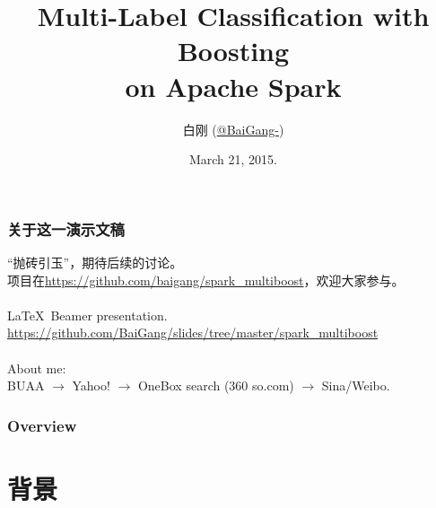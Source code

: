\documentclass{beamer}
\title[MultiBoost]{Multi-Label Classification with Boosting \\ on Apache Spark}
\author{
白刚  (\href{http://weibo.com/baigang111}{@BaiGang-})
} %
\institute[Sina] %
{
\textit{Sina Ad-Algo}
}
\date{March 21, 2015.} %
\begin{document}
\begin{frame}
\titlepage %
\end{frame}

\begin{frame}
\frametitle{关于这一演示文稿}
“抛砖引玉”，期待后续的讨论。 \\
项目在\url{https://github.com/baigang/spark_multiboost}，欢迎大家参与。 \\ \ \\

\LaTeX\  Beamer presentation.  \\
{ \small \url{https://github.com/BaiGang/slides/tree/master/spark_multiboost} } \\ \ \\

About me: \\
BUAA $\rightarrow$ Yahoo! $\rightarrow$ OneBox search (360 so.com) $\rightarrow$ Sina/Weibo.

\end{frame}

\begin{frame}
\frametitle{Overview} %
\tableofcontents %
\end{frame}



\section{背景}
\end{document}
